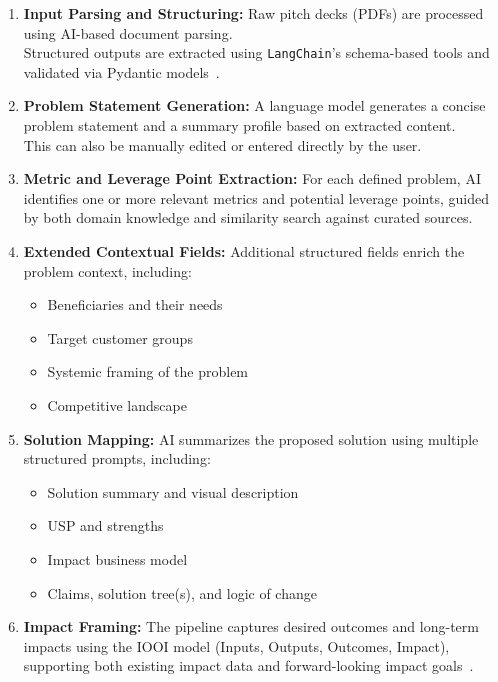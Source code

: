 \begin{enumerate}
    \item \textbf{Input Parsing and Structuring:} Raw pitch decks (PDFs) are processed using AI-based document parsing. \\Structured outputs are extracted using \texttt{LangChain}’s schema-based tools and validated via Pydantic models~\parencite{LCStructuredOutputs2025}.

    \item \textbf{Problem Statement Generation:} A language model generates a concise problem statement and a summary profile based on extracted content.\\ This can also be manually edited or entered directly by the user.

    \item \textbf{Metric and Leverage Point Extraction:} For each defined problem, AI identifies one or more relevant metrics and potential leverage points, guided by both domain knowledge and similarity search against curated sources.

    \item \textbf{Extended Contextual Fields:} Additional structured fields enrich the problem context, including:
    \begin{itemize}
        \item Beneficiaries and their needs
        \item Target customer groups
        \item Systemic framing of the problem
        \item Competitive landscape
    \end{itemize}

    \item \textbf{Solution Mapping:} AI summarizes the proposed solution using multiple structured prompts, including:
    \begin{itemize}
        \item Solution summary and visual description
        \item USP and strengths
        \item Impact business model
        \item Claims, solution tree(s), and logic of change
    \end{itemize}

    \item \textbf{Impact Framing:} The pipeline captures desired outcomes and long-term impacts using the IOOI model (Inputs, Outputs, Outcomes, Impact), supporting both existing impact data and forward-looking impact goals~\parencite{IOOIFrameworkRef2023}.


\end{enumerate}
